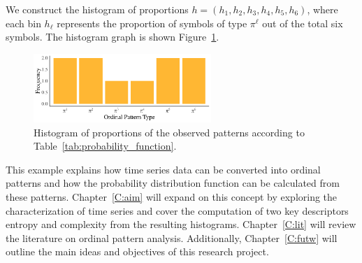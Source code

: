 We construct the histogram of proportions $h=(h_1,h_2,h_3,h_4,h_5,h_6)$, where each bin $h_\ell$ represents the proportion of symbols of type $\pi^\ell$ out of the total six symbols. The histogram graph is shown Figure~\ref{fig:histogram}.

\begin{figure}[hbt]
	\centering
	\includegraphics[width=0.6\textwidth]{frequency histogram}
	\caption{Histogram of proportions of the observed patterns according to Table~\ref{tab:probability_function}.}
	\label{fig:histogram}
\end{figure}

This example explains how time series data can be converted into ordinal patterns and how the probability distribution function can be calculated from these patterns.
Chapter~\ref{C:aim} will expand on this concept by exploring the characterization of time series and cover the computation of two key descriptors entropy and complexity from the resulting histograms. Chapter~\ref{C:lit} will review the literature on ordinal pattern analysis. Additionally, Chapter~\ref{C:futw} will outline the main ideas and objectives of this research project.      






